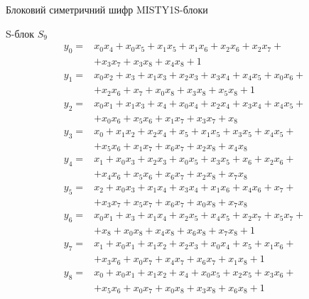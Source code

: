 \documentclass[10pt, ucs]{beamer}
\newenvironment{changemargin}[2]{%
\begin{list}{}{%
\setlength{\topsep}{0pt}%
\setlength{\leftmargin}{#1}%
\setlength{\rightmargin}{#2}%
\setlength{\listparindent}{\parindent}%
\setlength{\itemindent}{\parindent}%
\setlength{\parsep}{\parskip}%
}%
\item[]}{\end{list}}
\begin{document}
\begin{frame}[shrink]{Блоковий симетричний шифр MISTY1}{S-блоки}
    \begin{changemargin}{-2cm}{-2cm}
        \small
        \begin{block}{S-блок $S_9$}
            \begin{equation}
                \nonumber
                \begin{array}{ll}
                    y_0 =& x_0 x_4 + x_0 x_5 + x_1 x_5 + x_1 x_6 + x_2 x_6 + x_2 x_7 + \\
                    & + x_3 x_7 + x_3 x_8 + x_4 x_8 + 1 \\
                    y_1 =& x_0 x_2 + x_3 + x_1 x_3 + x_2 x_3 + x_3 x_4 + x_4 x_5 + x_0 x_6 + \\
                    & + x_2 x_6 + x_7 + x_0 x_8 + x_3 x_8 + x_5 x_8 +1 \\
                    y_2 =& x_0 x_1 + x_1 x_3 + x_4 + x_0 x_4 + x_2 x_4 + x_3 x_4 + x_4 x_5 + \\
                    & + x_0 x_6 + x_5 x_6 + x_1 x_7 + x_3 x_7 + x_8 \\
                    y_3 =& x_0 + x_1 x_2 + x_2 x_4 + x_5 + x_1 x_5 + x_3 x_5 + x_4 x_5 + \\
                    & + x_5 x_6 + x_1 x_7 + x_6 x_7 + x_2 x_8 + x_4 x_8 \\
                    y_4 =& x_1 + x_0 x_3 + x_2 x_3 + x_0 x_5 + x_3 x_5 + x_6 + x_2 x_6 + \\
                    & + x_4 x_6 + x_5 x_6 + x_6 x_7 + x_2 x_8 + x_7 x_8 \\
                    y_5 =& x_2 + x_0 x_3 + x_1 x_4 + x_3 x_4 + x_1 x_6 + x_4 x_6 + x_7 + \\
                    & + x_3 x_7 + x_5 x_7 + x_6 x_7 + x_0 x_8 + x_7 x_8 \\
                    y_6 =& x_0 x_1 + x_3 + x_1 x_4 + x_2 x_5 + x_4 x_5 + x_2 x_7 + x_5 x_7 + \\
                    & + x_8 + x_0 x_8 + x_4 x_8 + x_6 x_8 + x_7 x_8 +1 \\
                    y_7 =& x_1 + x_0 x_1 + x_1 x_2 + x_2 x_3 + x_0 x_4 + x_5 + x_1 x_6 + \\
                    & + x_3 x_6 + x_0 x_7 + x_4 x_7 + x_6 x_7 + x_1 x_8 +1 \\
                    y_8 =& x_0 + x_0 x_1 + x_1 x_2 + x_4 + x_0 x_5 + x_2 x_5 + x_3 x_6 + \\
                    & + x_5 x_6 + x_0 x_7 + x_0 x_8 + x_3 x_8 + x_6 x_8 +1 \\

                \end{array}
            \end{equation}
        \end{block}
    \end{changemargin}
\end{frame}
\end{document}
